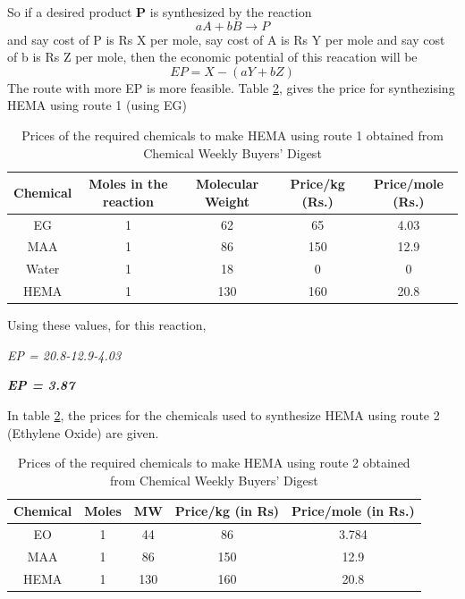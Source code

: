 \documentclass[12pt,a4paper]{report}
\begin{document}
So if a desired product \textbf{P} is synthesized by the reaction 
$$ aA + bB \rightarrow P $$
and say cost of P is Rs X per mole, say cost of A is Rs Y per mole and say cost of b is Rs Z per mole, then the economic potential of this reacation will be 
$$ EP = X -(aY + bZ) $$
The route with more EP is more feasible. Table \ref{tab::hysteresis}, gives the price for synthezising HEMA using route 1 (using EG)
\begin{table}[H]
	\centering
	\begin{tabular}{|c|c|c|c|c|}
		\hline
		\textbf{Chemical} & \textbf{Moles in the reaction}	
		& \textbf{Molecular Weight} & \textbf{Price/kg (Rs.)} & \textbf{Price/mole (Rs.)} \\
		\hline
		EG & 1 & 62 & 65 & 4.03 \\
		\hline
		MAA & 1 & 86 & 150 & 12.9 \\
		\hline
		Water & 1 & 18 & 0 & 0 \\
		\hline
		HEMA & 1 & 130 & 160 & 20.8 \\
		\hline
	\end{tabular}
	\label{tab::hysteresis}
	\caption{Prices of the required chemicals to make HEMA using route 1 obtained from Chemical Weekly Buyers' Digest}
\end{table}	


Using these values, for this reaction, 

\begin{center}
	\textit{EP = 20.8-12.9-4.03}
	
	
	\textit{\textbf{EP = 3.87} }
\end{center}

In table \ref{tab::hysteresis}, the prices for the chemicals used to synthesize HEMA using route 2 (Ethylene Oxide) are given.

\begin{table}[h]
	\centering
	\begin{tabular}{|c|c|c|c|c|}
		\hline
		\textbf{Chemical} & \textbf{Moles} & \textbf{MW} & \textbf{Price/kg (in Rs)} & \textbf{Price/mole (in Rs.)} \\
		\hline
		EO   & 1 & 44  & 86  & 3.784 \\
		\hline
		MAA  & 1 & 86  & 150 & 12.9 \\
		\hline
		HEMA & 1 & 130 & 160 & 20.8 \\
		\hline
	\end{tabular}
	\label{tab::hysteresis}
	\caption{Prices of the required chemicals to make HEMA using route 2 obtained from Chemical Weekly Buyers' Digest}
\end{table}
\end{document}
